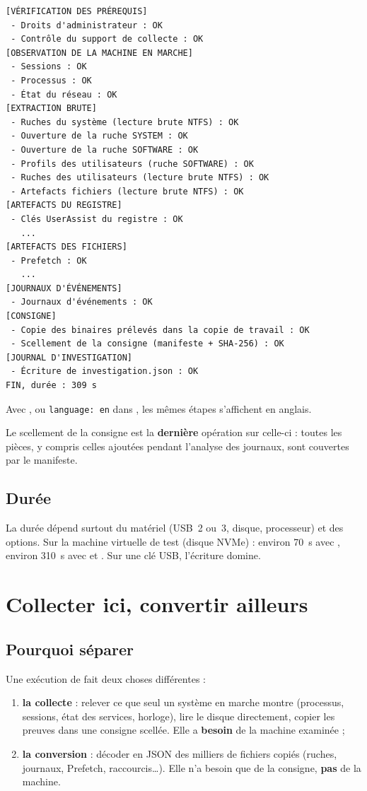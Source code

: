 \documentclass[11pt,a4paper,oneside]{report}
\begin{document}
\begin{lstlisting}
[VÉRIFICATION DES PRÉREQUIS]
 - Droits d'administrateur : OK
 - Contrôle du support de collecte : OK
[OBSERVATION DE LA MACHINE EN MARCHE]
 - Sessions : OK
 - Processus : OK
 - État du réseau : OK
[EXTRACTION BRUTE]
 - Ruches du système (lecture brute NTFS) : OK
 - Ouverture de la ruche SYSTEM : OK
 - Ouverture de la ruche SOFTWARE : OK
 - Profils des utilisateurs (ruche SOFTWARE) : OK
 - Ruches des utilisateurs (lecture brute NTFS) : OK
 - Artefacts fichiers (lecture brute NTFS) : OK
[ARTEFACTS DU REGISTRE]
 - Clés UserAssist du registre : OK
   ...
[ARTEFACTS DES FICHIERS]
 - Prefetch : OK
   ...
[JOURNAUX D'ÉVÉNEMENTS]
 - Journaux d'événements : OK
[CONSIGNE]
 - Copie des binaires prélevés dans la copie de travail : OK
 - Scellement de la consigne (manifeste + SHA-256) : OK
[JOURNAL D'INVESTIGATION]
 - Écriture de investigation.json : OK
FIN, durée : 309 s
\end{lstlisting}

Avec , ou \texttt{language: en} dans , les
mêmes étapes s'affichent en anglais.

Le scellement de la consigne est la \textbf{dernière} opération sur celle-ci :
toutes les pièces, y compris celles ajoutées pendant l'analyse des journaux, sont
couvertes par le manifeste.

\section{Durée}

La durée dépend surtout du matériel (USB~2 ou~3, disque, processeur) et des
options. Sur la machine virtuelle de test (disque NVMe) : environ 70~s avec
, environ 310~s avec  et . Sur une clé USB,
l'écriture domine.

\chapter{Collecter ici, convertir ailleurs}\label{chap:separation}

\section{Pourquoi séparer}

Une exécution de \wac{} fait deux choses différentes :
\begin{enumerate}
  \item \textbf{la collecte} : relever ce que seul un système en marche montre
        (processus, sessions, état des services, horloge), lire le disque
        directement, copier les preuves dans une consigne scellée. Elle a
        \textbf{besoin} de la machine examinée ;
  \item \textbf{la conversion} : décoder en JSON des milliers de fichiers
        copiés (ruches, journaux, Prefetch, raccourcis\ldots). Elle n'a besoin
        que de la consigne, \textbf{pas} de la machine.
\end{enumerate}
\end{document}
